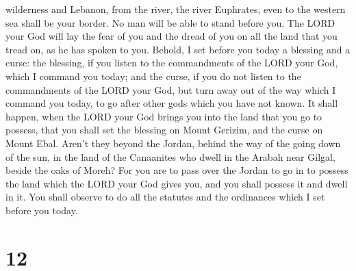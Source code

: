 wilderness and Lebanon, from the river, the river Euphrates, even to the
western sea shall be your border.  No man will be able to
stand before you. The LORD your God will lay the fear of you and the
dread of you on all the land that you tread on, as he has spoken to you.
 Behold, I set before you today a blessing and a curse:
 the blessing, if you listen to the commandments of the
LORD your God, which I command you today;  and the curse,
if you do not listen to the commandments of the LORD your God, but turn
away out of the way which I command you today, to go after other gods
which you have not known.  It shall happen, when the LORD
your God brings you into the land that you go to possess, that you shall
set the blessing on Mount Gerizim, and the curse on Mount Ebal.
 Aren't they beyond the Jordan, behind the way of the going
down of the sun, in the land of the Canaanites who dwell in the Arabah
near Gilgal, beside the oaks of Moreh?  For you are to pass
over the Jordan to go in to possess the land which the LORD your God
gives you, and you shall possess it and dwell in it.  You
shall observe to do all the statutes and the ordinances which I set
before you today.

\hypertarget{section-11}{%
\section{12}\label{section-11}}

